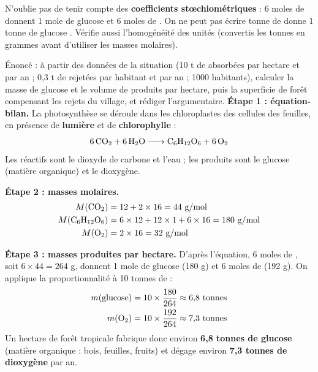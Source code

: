 \documentclass[11pt]{article}
\newcommand{\cle}[1]{{\popxbold\color{popdark}#1}}
\newcounter{popsec}
\newcounter{popsub}
\newcommand{\courssub}[1]{%
  \stepcounter{popsub}%
  \par\vspace{9pt}\noindent{\popxbold\fontsize{11.5}{13}\selectfont\color{popink}{\color{poporange}\thepopsec.\thepopsub}\hspace{6pt}#1}\par\nopagebreak\vspace{4pt}
}
\begin{document}
\begin{attention}
N'oublie pas de tenir compte des \textbf{coefficients stœchiométriques} : 6 moles de  donnent 1 mole de glucose et 6 moles de . On ne peut pas écrire  tonne de  donne 1 tonne de glucose \fg. Vérifie aussi l'homogénéité des unités (convertis les tonnes en grammes avant d'utiliser les masses molaires).
\end{attention}

\courssub{Démarche et corrigé commenté}

\begin{exoresolu}
Énoncé : à partir des données de la situation (10 t de  absorbées par hectare et par an ; 0,3 t de  rejetées par habitant et par an ; \num{1000} habitants), calculer la masse de glucose et le volume de  produits par hectare, puis la superficie de forêt compensant les rejets du village, et rédiger l'argumentaire.
\tcblower
\textbf{Étape 1 : équation-bilan.} La photosynthèse se déroule dans les \cle{chloroplastes} des cellules des feuilles, en présence de \textbf{lumière} et de \textbf{chlorophylle} :
\[ \ce{6CO2 + 6H2O -> C6H12O6 + 6O2} \]
Les réactifs sont le dioxyde de carbone et l'eau ; les produits sont le glucose (matière organique) et le dioxygène.

\textbf{Étape 2 : masses molaires.}
\begin{align*}
M(\ce{CO2}) &= 12 + 2 \times 16 = 44 \text{ g/mol} \\
M(\ce{C6H12O6}) &= 6 \times 12 + 12 \times 1 + 6 \times 16 = 180 \text{ g/mol} \\
M(\ce{O2}) &= 2 \times 16 = 32 \text{ g/mol}
\end{align*}

\textbf{Étape 3 : masses produites par hectare.} D'après l'équation, 6 moles de , soit $6 \times 44 = 264$ g, donnent 1 mole de glucose (180 g) et 6 moles de  (192 g). On applique la proportionnalité à 10 tonnes de  :
\begin{align*}
m(\text{glucose}) &= 10 \times \dfrac{180}{264} \approx 6{,}8 \text{ tonnes} \\
m(\ce{O2}) &= 10 \times \dfrac{192}{264} \approx 7{,}3 \text{ tonnes}
\end{align*}
Un hectare de forêt tropicale fabrique donc environ \textbf{6,8 tonnes de glucose} (matière organique : bois, feuilles, fruits) et dégage environ \textbf{7,3 tonnes de dioxygène} par an.


\end{exoresolu}
\end{document}
